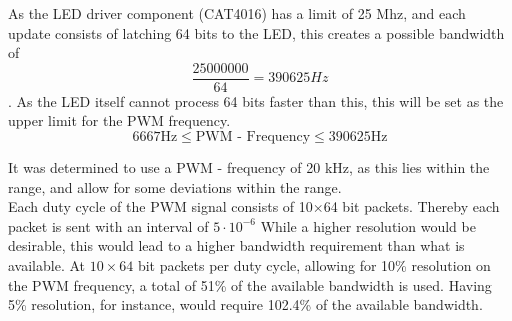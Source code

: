 As the LED driver component (CAT4016) has a limit of 25 Mhz, and each update consists of latching 64 bits to the LED, this creates a possible bandwidth of $$\frac{25000000}{64} =  390625 Hz$$. 
As the LED itself cannot process 64 bits faster than this, this will be set as the upper limit for the PWM frequency.    
$$6667 \text{Hz}  \leq \text{PWM - Frequency}  \leq 390625 \text{Hz}  $$

It was determined to use a PWM - frequency of 20 kHz, as this lies within the range, and allow for some deviations within the range.  \\

Each duty cycle of the PWM signal consists of 10$\times$64 bit packets.
Thereby each packet is sent with an interval of $5 \cdot 10^{-6}$
While a higher resolution would be desirable, this would lead to a higher bandwidth requirement than what is available.
At $10\times64$ bit packets per duty cycle, allowing for 10\% resolution on the PWM frequency, a total of 51\% of the available bandwidth is used.
Having 5\% resolution, for instance, would require 102.4\% of the available bandwidth.
